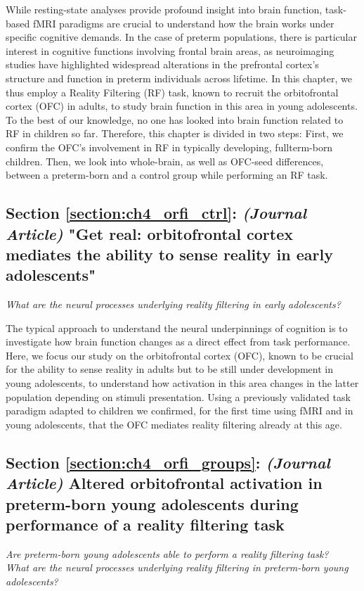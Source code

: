 While resting-state analyses provide profound insight into brain function, task-based fMRI paradigms are crucial to understand how the brain works under specific cognitive demands. In the case of preterm populations, there is particular interest in cognitive functions involving frontal brain areas, as neuroimaging studies have highlighted widespread alterations in the prefrontal cortex's structure and function in preterm individuals across lifetime. In this chapter, we thus employ a Reality Filtering (RF) task, known to recruit the orbitofrontal cortex (OFC) in adults, to study brain function in this area in young adolescents. To the best of our knowledge, no one has looked into brain function related to RF in children so far. Therefore, this chapter is divided in two steps: First, we confirm the OFC's involvement in RF in typically developing, fullterm-born children. Then, we look into whole-brain, as well as OFC-seed differences, between a preterm-born and a control group while performing an RF task.

\subsection*{Section \ref{section:ch4_orfi_ctrl}: \textit{(Journal Article)} "Get real: orbitofrontal cortex mediates the ability to sense reality in early adolescents"}
\textit{What are the neural processes underlying reality filtering in early adolescents?}

The typical approach to understand the neural underpinnings of cognition is to investigate how brain function changes as a direct effect from task performance. Here, we focus our study on the orbitofrontal cortex (OFC), known to be crucial for the ability to sense reality in adults but to be still under development in young adolescents, to understand how activation in this area changes in the latter population depending on stimuli presentation. Using a previously validated task paradigm adapted to children we confirmed, for the first time using fMRI and in young adolescents, that the OFC mediates reality filtering already at this age.

\subsection*{Section \ref{section:ch4_orfi_groups}: \textit{(Journal Article)} Altered orbitofrontal activation in preterm-born young adolescents during performance of a reality filtering task}
\textit{Are preterm-born young adolescents able to perform a reality filtering task?}\\
\textit{What are the neural processes underlying reality filtering in preterm-born young adolescents?}

